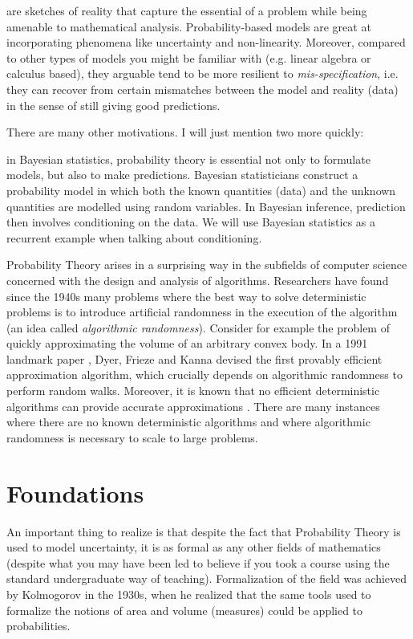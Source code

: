 \documentclass{article}
\begin{document}
 are sketches of reality that capture the essential of a problem while being amenable to mathematical analysis. Probability-based models are great at incorporating phenomena like uncertainty and non-linearity. Moreover, compared to other types of models you might be familiar with (e.g. linear algebra or calculus based), they arguable tend to be more resilient to \emph{mis-specification}, i.e. they can recover from certain mismatches between the model and reality (data) in the sense of still giving good predictions.

There are many other motivations. I will just mention two more quickly:

 in Bayesian statistics, probability theory is essential not only to formulate models, but also to make predictions. Bayesian statisticians construct a probability model in which both the known quantities (data) and the unknown quantities are modelled using random variables. In Bayesian inference, prediction then involves  conditioning on the data.  We will use Bayesian statistics as a recurrent example when talking about conditioning. 

  Probability Theory arises in a surprising way in the subfields of computer science concerned with the design and analysis of algorithms. Researchers have found since the 1940s many problems where the best way to solve deterministic problems is to introduce artificial randomness in the execution of the algorithm (an idea called \emph{algorithmic randomness}). Consider for example the problem of quickly approximating the volume of an arbitrary convex body. In a 1991 landmark paper \cite{dyer_random_1991}, Dyer, Frieze and Kanna devised the first provably efficient approximation algorithm, which crucially depends on algorithmic randomness to perform random walks. Moreover, it is known that no efficient deterministic algorithms can provide accurate approximations \cite{bfirfiny_computing_nodate}. There are many instances where there are no known deterministic algorithms and where algorithmic randomness is necessary to scale to large problems.  


\section{Foundations}

  An important thing to realize is that despite the fact that Probability Theory is used to model uncertainty, it is as formal as any other fields of mathematics (despite what you may have been led to believe if you took a course using the standard undergraduate way of teaching). Formalization of the field was achieved by Kolmogorov in the 1930s, when he realized that the same tools used to formalize the notions of area and volume (measures) could be applied to probabilities. 
\end{document}
